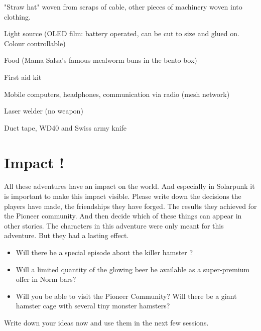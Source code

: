 \begin{npcBox}[title=Spark]
    \begin{stressSection}
    \end{stressSection}
    \begin{tabularx}{\textwidth}{ XX }
    \end{tabularx}

    \begin{consequences}
    \item {}
    \item {}
    \item {}
    \end{consequences}

    \begin{npcDescription}
    "Straw hat" woven from scraps of cable, other pieces of machinery woven into clothing.
    \end{npcDescription}


    \begin{equipment}
    \item Light source (OLED film: battery operated, can be cut to size and glued on. Colour controllable)
    \item Food (Mama Salsa's famous mealworm buns in the bento box)
    \item First aid kit
    \item Mobile computers, headphones, communication via radio (mesh network)
    \item Laser welder (no weapon)
    \item Duct tape, WD40 and Swiss army knife
    \end{equipment}
\end{npcBox}

\newpage

\section{Impact !}

All these adventures have an impact on the world. And especially in Solarpunk it is important to make this impact visible. Please write down the decisions the players have made, the friendships they have forged. The results they achieved for the Pioneer community. And then decide which of these things can appear in other stories.
The characters in this adventure were only meant for this adventure. But they had a lasting effect.

\begin{itemize}
    \item Will there be a special episode about the killer hamster ?
    \item Will a limited quantity of the glowing beer be available as a super-premium offer in Norm bars?
    \item Will you be able to visit the Pioneer Community? Will there be a giant hamster cage with several tiny monster hamsters?
\end{itemize}

Write down your ideas now and use them in the next few sessions.

